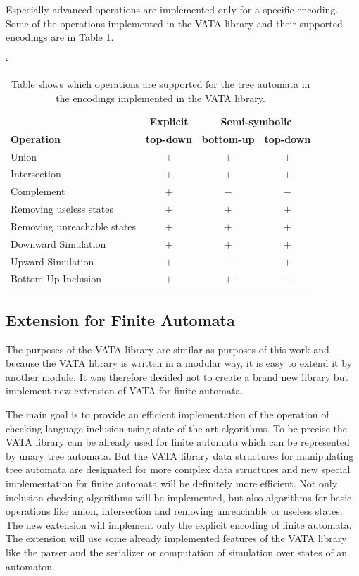 Especially advanced operations are implemented only for a specific encoding. Some of the operations implemented in the VATA library and their 
supported encodings are in Table \ref{tabOp}.
\begin{savenotes}
\begin{table}[h]
	\begin{center}
		\catcode`
		\begin{tabular}{| l | c | c | c |} \hline
		& {\textbf{Explicit}} & \multicolumn{2}{|c|}{\textbf{Semi-symbolic}} \\ \cline{2-4}
		\textbf{Operation} & \textbf{top-down} & \textbf{bottom-up} & \textbf{top-down} \\ \hline
		Union & $+$ & $+$ & $+$ \\
		Intersection & $+$ & $+$ & $+$ \\
		Complement & $+$ & $-$ & $-$ \\
		Removing useless states & $+$ & $+$ & $+$ \\
		Removing unreachable states & $+$ & $+$ & $+$ \\
		Downward Simulation & $+$ & $+$ & $+$ \\
		Upward Simulation & $+$ & $-$ & $+$ \\
		Bottom-Up Inclusion  & $+$ & $+$ & $-$ \\ 
    \hline
		\end{tabular}
	\caption{Table shows which operations are supported for the tree automata in the encodings implemented in the VATA library.}
	\label{tabOp}
	\end{center}
\end{table}
\end{savenotes}


\subsection{Extension for Finite Automata}
The purposes of the VATA library are similar as purposes of this work and because the VATA library is written in a modular way, it is easy 
to extend it by another module. It was therefore decided not to create a brand new library but implement new extension of VATA for finite automata.

The main goal is to provide an efficient implementation of the operation of checking language inclusion using state-of-the-art algorithms. 
To be precise the VATA library can be already used for finite automata which can be represented by unary
tree automata. But the VATA library data structures for manipulating tree automata are designated for more complex data structures
and new special implementation for finite automata will be definitely more efficient. 
Not only inclusion checking algorithms will be implemented, but also algorithms for basic operations like union, intersection and removing unreachable or 
useless states. The new extension will implement only the explicit encoding of finite automata. 
The extension will use some already implemented features of the VATA library like the parser and the serializer 
or computation of simulation over states of an automaton.

